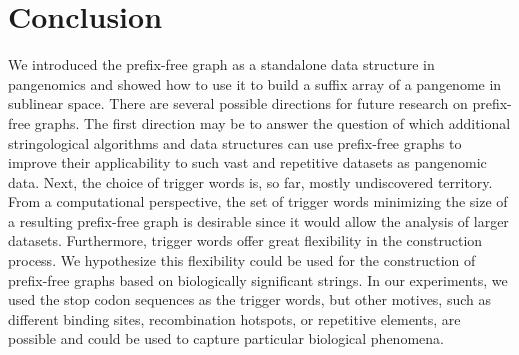 \section{Conclusion}
We introduced the prefix-free graph as a standalone data structure in pangenomics and showed how to use it to build a suffix array of a pangenome in sublinear space.
There are several possible directions for future research on prefix-free graphs.
The first direction may be to answer the question of which additional stringological algorithms and data structures can use prefix-free graphs to improve their applicability to such vast and repetitive datasets as pangenomic data.
Next, the choice of trigger words is, so far, mostly undiscovered territory.
From a computational perspective, the set of trigger words minimizing the size of a resulting prefix-free graph is desirable since it would allow the analysis of larger datasets.
Furthermore, trigger words offer great flexibility in the construction process.
We hypothesize this flexibility could be used for the construction of prefix-free graphs based on biologically significant strings.
In our experiments, we used the stop codon sequences as the trigger words, but other motives, such as different binding sites, recombination hotspots, or repetitive elements, are possible and could be used to capture particular biological phenomena.

